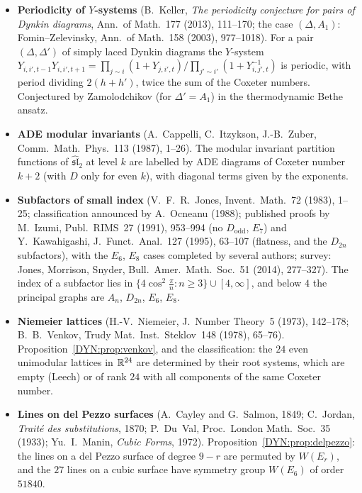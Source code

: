 \begin{itemize}[leftmargin=1.2em,itemsep=0.45em]
  by the Cartan matrices of finite type; the cluster complex is the dual of a generalized associahedron.
\item \textbf{Periodicity of $Y$-systems} (B.~Keller, \emph{The periodicity conjecture for pairs of Dynkin
  diagrams}, Ann.\ of Math.~177 (2013), 111--170; the case $(\Delta,A_1)$: Fomin--Zelevinsky, Ann.\ of
  Math.~158 (2003), 977--1018). For a pair $(\Delta,\Delta')$ of simply laced Dynkin diagrams the
  $Y$-system
  $Y_{i,i',t-1}Y_{i,i',t+1}=\prod_{j\sim i}(1+Y_{j,i',t})\big/\prod_{j'\sim i'}(1+Y_{i,j',t}^{-1})$ is periodic,
  with period dividing $2(h+h')$, twice the sum of the Coxeter numbers. Conjectured by Zamolodchikov
  (for $\Delta'=A_1$) in the thermodynamic Bethe ansatz.
\item \textbf{ADE modular invariants} (A.~Cappelli, C.~Itzykson, J.-B.~Zuber, Comm.\ Math.\ Phys.~113
  (1987), 1--26). The modular invariant partition functions of $\widehat{\mathfrak{sl}}_2$ at level $k$ are
  labelled by ADE diagrams of Coxeter number $k+2$ (with $D$ only for even $k$), with diagonal terms given
  by the exponents.
\item \textbf{Subfactors of small index} (V.~F.~R.~Jones, Invent.\ Math.~72 (1983), 1--25; classification
  announced by A.~Ocneanu (1988); published proofs by M.~Izumi, Publ.\ RIMS~27 (1991), 953--994
  (no $D_{\mathrm{odd}}$, $E_7$) and Y.~Kawahigashi, J.\ Funct.\ Anal.~127 (1995), 63--107 (flatness, and
  the $D_{2n}$ subfactors), with the $E_6$, $E_8$ cases completed by several authors; survey: Jones, Morrison, Snyder, Bull.\ Amer.\
  Math.\ Soc.~51 (2014), 277--327). The index of a subfactor lies in
  $\{4\cos^2\frac\pi n:n\ge3\}\cup[4,\infty]$, and below $4$ the principal graphs are $A_n$, $D_{2n}$,
  $E_6$, $E_8$.
\item \textbf{Niemeier lattices} (H.-V.~Niemeier, J.\ Number Theory~5 (1973), 142--178; B.~B.~Venkov,
  Trudy Mat.\ Inst.\ Steklov~148 (1978), 65--76). Proposition~\ref{DYN:prop:venkov}, and the
  classification: the $24$ even unimodular lattices in $\mathbb{R}^{24}$ are determined by their root systems,
  which are empty (Leech) or of rank $24$ with all components of the same Coxeter number.
\item \textbf{Lines on del Pezzo surfaces} (A.~Cayley and G.~Salmon, 1849; C.~Jordan, \emph{Trait\'e des
  substitutions}, 1870; P.~Du~Val, Proc.\ London Math.\ Soc.~35 (1933); Yu.~I.~Manin, \emph{Cubic Forms},
  1972). Proposition~\ref{DYN:prop:delpezzo}: the lines on a del Pezzo surface of degree $9-r$ are permuted
  by $W(E_r)$, and the $27$ lines on a cubic surface have symmetry group $W(E_6)$ of order $51840$.
\end{itemize}

